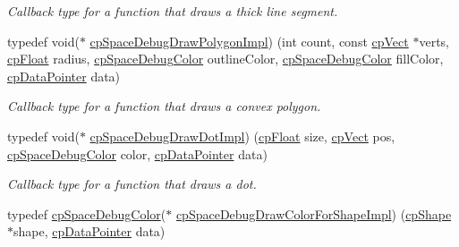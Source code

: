 \begin{DoxyCompactItemize}
\begin{DoxyCompactList}\small\item\em Callback type for a function that draws a thick line segment. \end{DoxyCompactList}\item 
\hypertarget{group__cp_space_ga2138e846816a1e581a3433740a596ab6}{}typedef void($\ast$ \hyperlink{group__cp_space_ga2138e846816a1e581a3433740a596ab6}{cp\+Space\+Debug\+Draw\+Polygon\+Impl}) (int count, const \hyperlink{structcp_vect}{cp\+Vect} $\ast$verts, \hyperlink{group__basic_types_gac1ed65573e035bf892505768c852d8d3}{cp\+Float} radius, \hyperlink{structcp_space_debug_color}{cp\+Space\+Debug\+Color} outline\+Color, \hyperlink{structcp_space_debug_color}{cp\+Space\+Debug\+Color} fill\+Color, \hyperlink{group__basic_types_ga2ac2c3c31e21893941f9e4f8ee279447}{cp\+Data\+Pointer} data)\label{group__cp_space_ga2138e846816a1e581a3433740a596ab6}

\begin{DoxyCompactList}\small\item\em Callback type for a function that draws a convex polygon. \end{DoxyCompactList}\item 
\hypertarget{group__cp_space_gadf9a758a2f1c3b53551829573b722e5a}{}typedef void($\ast$ \hyperlink{group__cp_space_gadf9a758a2f1c3b53551829573b722e5a}{cp\+Space\+Debug\+Draw\+Dot\+Impl}) (\hyperlink{group__basic_types_gac1ed65573e035bf892505768c852d8d3}{cp\+Float} size, \hyperlink{structcp_vect}{cp\+Vect} pos, \hyperlink{structcp_space_debug_color}{cp\+Space\+Debug\+Color} color, \hyperlink{group__basic_types_ga2ac2c3c31e21893941f9e4f8ee279447}{cp\+Data\+Pointer} data)\label{group__cp_space_gadf9a758a2f1c3b53551829573b722e5a}

\begin{DoxyCompactList}\small\item\em Callback type for a function that draws a dot. \end{DoxyCompactList}\item 
\hypertarget{group__cp_space_gaba1fec950f2b58c7c72ab5ca553bdf43}{}typedef \hyperlink{structcp_space_debug_color}{cp\+Space\+Debug\+Color}($\ast$ \hyperlink{group__cp_space_gaba1fec950f2b58c7c72ab5ca553bdf43}{cp\+Space\+Debug\+Draw\+Color\+For\+Shape\+Impl}) (\hyperlink{structcp_shape}{cp\+Shape} $\ast$shape, \hyperlink{group__basic_types_ga2ac2c3c31e21893941f9e4f8ee279447}{cp\+Data\+Pointer} data)\label{group__cp_space_gaba1fec950f2b58c7c72ab5ca553bdf43}


\end{DoxyCompactItemize}
